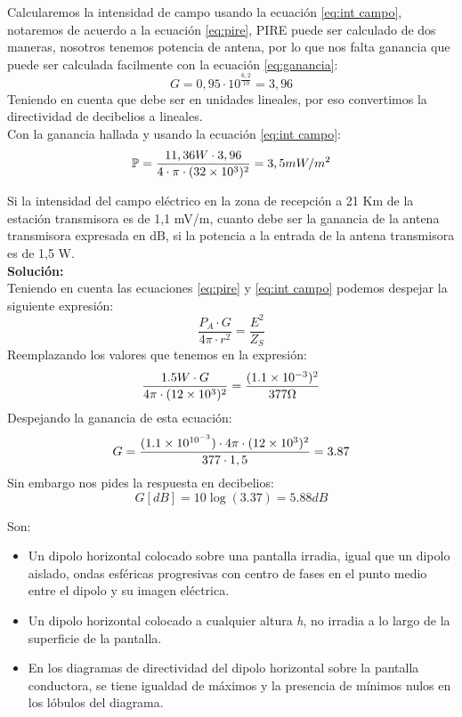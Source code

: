 \documentclass[
	12pt, %
	fleqn, %
	a4paper, %
	oneside, %
]{LegrandOrangeBook}
\begin{document}
\begin{example}
Calcularemos la intensidad de campo usando la ecuación \ref{eq:int campo}, notaremos de acuerdo a la ecuación \ref{eq:pire}, PIRE puede ser calculado de dos maneras, nosotros tenemos potencia de antena, por lo que nos falta ganancia que puede ser calculada facilmente con la ecuación  \ref{eq:ganancia}:
\begin{displaymath}
G=0,95\cdot 10^{\frac{6,2}{10}}=3,96
\end{displaymath}
Teniendo en cuenta que debe ser en unidades lineales, por eso convertimos la directividad de decibelios a lineales.\\
Con la ganancia hallada y usando la ecuación \ref{eq:int campo}:
\begin{displaymath}
\mathbb{P}=\frac{11,36 W\cdot 3,96}{4\cdot\pi\cdot(32\times 10^{3})^2}=3,5 mW/m^2
\end{displaymath}
\end{example}
\begin{example}
Si la intensidad del campo eléctrico en la zona de recepción a 21 Km de la estación transmisora es de 1,1 mV/m, cuanto debe ser la ganancia de la antena transmisora expresada en dB, si la potencia a la entrada de la antena transmisora es de 1,5 W.\\
\textbf{Solución:}\\
Teniendo en cuenta las ecuaciones \ref{eq:pire} y \ref{eq:int campo} podemos despejar la siguiente expresión:
\begin{displaymath}
\frac{P_A\cdot G}{4\pi\cdot r^2}=\frac{E^2}{Z_S}
\end{displaymath}
Reemplazando los valores que tenemos en la expresión:
\begin{displaymath}
\frac{1.5 W\cdot G}{4\pi\cdot (12\times 10^{3})^2}=\frac{(1.1\times 10^{-3})^2}{377 \Omega}
\end{displaymath}
Despejando la ganancia de esta ecuación:
\begin{displaymath}
G=\frac{(1.1\times 10^{10^{-3}})\cdot 4\pi\cdot (12\times 10^{3})^2}{377\cdot 1,5}=3.87
\end{displaymath}
Sin embargo nos pides la respuesta en decibelios:
\begin{displaymath}
G[dB]=10\log(3.37)=5.88 dB
\end{displaymath}
\end{example}
\begin{corollary}
Son:
\begin{itemize}
\item Un dipolo horizontal colocado sobre una pantalla irradia, igual que un dipolo aislado, ondas esféricas progresivas con centro de fases en el punto medio entre el dipolo y su imagen eléctrica.
\item Un dipolo horizontal colocado a cualquier altura \textit{h}, no irradia a lo largo de la superficie de la pantalla.
\item En los diagramas de directividad del dipolo horizontal sobre la pantalla conductora, se tiene igualdad de máximos y la presencia de mínimos nulos en los lóbulos del diagrama.
\end{itemize}
\end{corollary}
\end{document}

